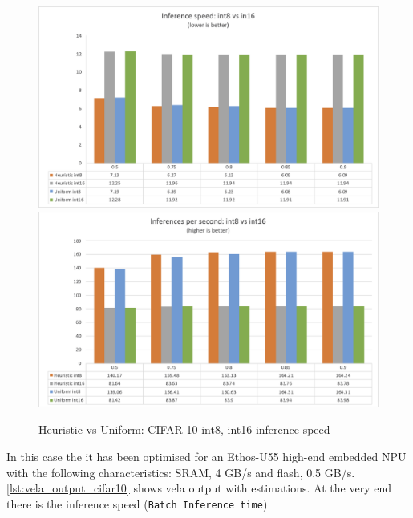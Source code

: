 \begin{figure}
    \centering
    {\includegraphics[width=1\linewidth]{images/results/cifar10_inf_speed.png}}
    {\includegraphics[width=1\linewidth]{images/results/cifar10_infs_second.png}}
    \caption{Heuristic vs Uniform: CIFAR-10 int8, int16 inference speed}\label{fig:cifar10_inf_speed}
\end{figure}

In this case the it has been optimised for an Ethos-U55 high-end embedded NPU
with the following characteristics: SRAM, 4 GB/s and flash, 0.5 GB/s.
\autoref{lst:vela_output_cifar10} shows vela output with estimations. At the very end
there is the inference speed (\texttt{Batch Inference time})

